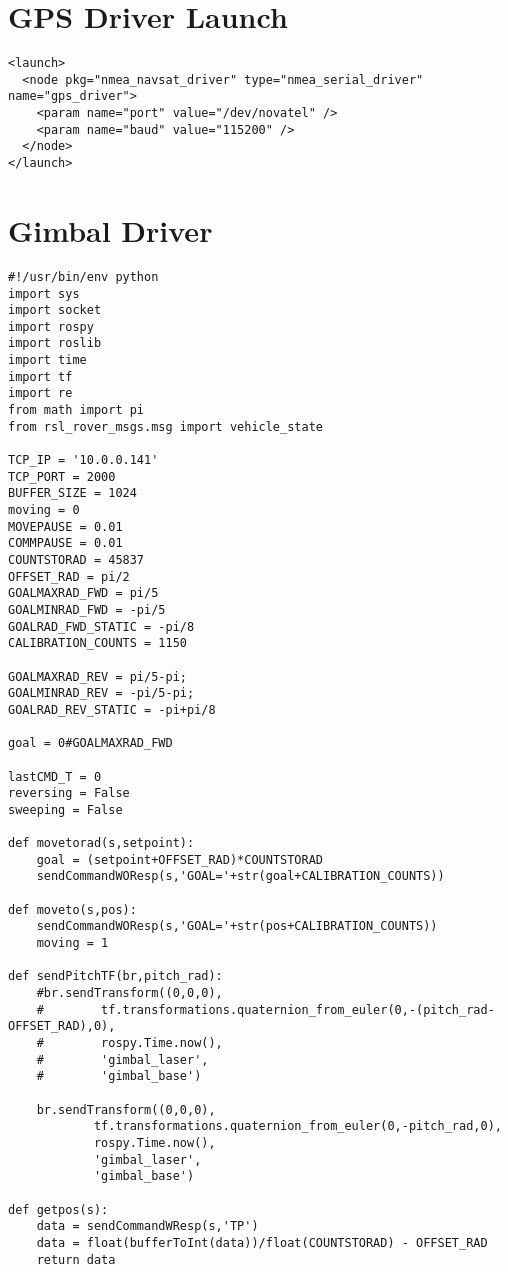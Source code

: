 \section*{GPS Driver Launch}
\begin{lstlisting}[breaklines=true,basicstyle=\tiny]
<launch>
  <node pkg="nmea_navsat_driver" type="nmea_serial_driver" name="gps_driver">
    <param name="port" value="/dev/novatel" />
    <param name="baud" value="115200" />
  </node>
</launch>
\end{lstlisting}

\section*{Gimbal Driver}
\begin{lstlisting}[breaklines=true,basicstyle=\tiny]
#!/usr/bin/env python
import sys
import socket
import rospy
import roslib
import time
import tf
import re
from math import pi
from rsl_rover_msgs.msg import vehicle_state

TCP_IP = '10.0.0.141'
TCP_PORT = 2000
BUFFER_SIZE = 1024
moving = 0
MOVEPAUSE = 0.01
COMMPAUSE = 0.01
COUNTSTORAD = 45837
OFFSET_RAD = pi/2
GOALMAXRAD_FWD = pi/5
GOALMINRAD_FWD = -pi/5
GOALRAD_FWD_STATIC = -pi/8
CALIBRATION_COUNTS = 1150

GOALMAXRAD_REV = pi/5-pi;
GOALMINRAD_REV = -pi/5-pi;
GOALRAD_REV_STATIC = -pi+pi/8

goal = 0#GOALMAXRAD_FWD

lastCMD_T = 0
reversing = False
sweeping = False

def movetorad(s,setpoint):
    goal = (setpoint+OFFSET_RAD)*COUNTSTORAD        
    sendCommandWOResp(s,'GOAL='+str(goal+CALIBRATION_COUNTS))

def moveto(s,pos):
    sendCommandWOResp(s,'GOAL='+str(pos+CALIBRATION_COUNTS))
    moving = 1

def sendPitchTF(br,pitch_rad):
    #br.sendTransform((0,0,0),
    #        tf.transformations.quaternion_from_euler(0,-(pitch_rad-OFFSET_RAD),0),
    #        rospy.Time.now(),
    #        'gimbal_laser',
    #        'gimbal_base')

    br.sendTransform((0,0,0),
            tf.transformations.quaternion_from_euler(0,-pitch_rad,0),
            rospy.Time.now(),
            'gimbal_laser',
            'gimbal_base')

def getpos(s):
    data = sendCommandWResp(s,'TP')
    data = float(bufferToInt(data))/float(COUNTSTORAD) - OFFSET_RAD
    return data
    

\end{lstlisting}
